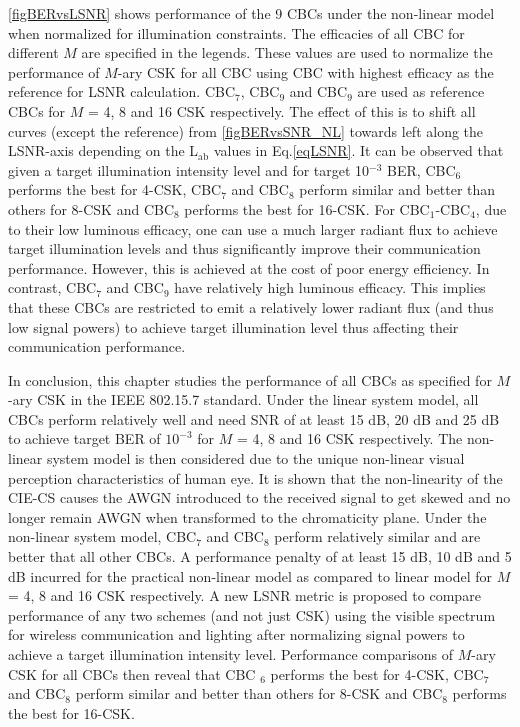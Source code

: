 \figurename{ }\ref{figBERvsLSNR} shows performance of the 9 CBCs under the non-linear model when normalized for illumination constraints. The efficacies of all CBC for different $M$ are specified in the legends. These values are used to normalize the performance of $M$-ary CSK for all CBC using CBC with highest efficacy as the reference for LSNR calculation. CBC$_{7}$, CBC$_{9}$ and CBC$_{9}$ are used as reference CBCs for $M$ = 4, 8 and 16 CSK respectively. The effect of this is to shift all curves (except the reference) from \figurename{ }\ref{figBERvsSNR_NL} towards left along the LSNR-axis depending on the L$_{\text{ab}}$ values in Eq.\eqref{eqLSNR}. It can be observed that given a target illumination intensity level and for target 10$^{-3}$ BER, CBC$_{6}$ performs the best for 4-CSK, CBC$_{7}$ and CBC$_{8}$ perform similar and better than others for 8-CSK and CBC$_{8}$ performs the best for 16-CSK. For CBC$_{1}$-CBC$_{4}$, due to their low luminous efficacy, one can use a much larger radiant flux to achieve target illumination levels and thus significantly improve their communication performance. However, this is achieved at the cost of poor energy efficiency. In contrast, CBC$_{7}$ and CBC$_{9}$ have relatively high luminous efficacy. This implies that these CBCs are restricted to emit a relatively lower radiant flux (and thus low signal powers) to achieve target illumination level thus affecting their communication performance. 

In conclusion, this chapter studies the performance of all CBCs as specified for $M$-ary CSK in the IEEE 802.15.7 standard. Under the linear system model, all CBCs perform relatively well and need SNR of at least 15 dB, 20 dB and 25 dB to achieve target BER of $10^{-3}$ for $M$ = 4, 8 and 16 CSK respectively. The non-linear system model is then considered due to the unique non-linear visual perception characteristics of human eye. It is shown that the non-linearity of the CIE-CS causes the AWGN introduced to the received signal to get skewed and no longer remain AWGN when transformed to the chromaticity plane. Under the non-linear system model, CBC$_{7}$ and CBC$_{8}$ perform relatively similar and are better that all other CBCs. A performance penalty of at least 15 dB, 10 dB and 5 dB incurred for the practical non-linear model as compared to linear model for $M$ = 4, 8 and 16 CSK respectively. A new LSNR metric is proposed to compare performance of any two schemes (and not just CSK) using the visible spectrum for wireless communication and lighting after normalizing signal powers to achieve a target illumination intensity level. Performance comparisons of $M$-ary CSK for all CBCs then reveal that CBC $_{6}$ performs the best for 4-CSK, CBC$_{7}$ and CBC$_{8}$ perform similar and better than others for 8-CSK and CBC$_{8}$ performs the best for 16-CSK. 

